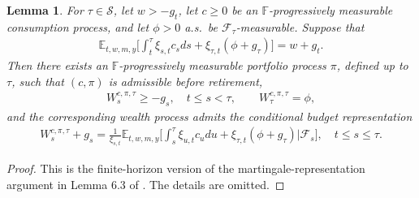 \documentclass[a4paper,11pt]{amsart}
\numberwithin{equation}{section}
\newtheorem{lemma}{Lemma}[section]
\newcommand{\blue}[1]{{\color{black}#1}}
\begin{document}
{\begin{lemma}\label{budegt}
{For $\tau\in\mathcal S$, let $w>-g_t$, let $c\geq0$ be an $\mathbb F$-progressively measurable consumption process, and let $\phi>0$ a.s.\ be $\mathcal F_\tau$-measurable. Suppose that}
\begin{align*}
\mathbb E_{t,w,m,y}\bigg[\int_t^\tau\xi_{s,t}c_sds+\xi_{\tau,t}(\phi+g_\tau)\bigg]=w+g_t.
\end{align*}
Then there exists an $\mathbb F$-progressively measurable portfolio process $\pi$, defined up to $\tau$, such that $(c,\pi)$ is admissible before retirement,
\begin{align*}
W_s^{c,\pi,\tau}\geq-g_s,\quad t\leq s<\tau,\qquad W_\tau^{c,\pi,\tau}=\phi,
\end{align*}
and the corresponding wealth process admits the conditional budget representation
\begin{align*}
W_s^{c,\pi,\tau}+g_s=\frac{1}{\xi_{s,t}}\mathbb E_{t,w,m,y}\bigg[\int_s^\tau\xi_{u,t}c_udu+\xi_{\tau,t}(\phi+g_\tau)\bigg|\mathcal F_s\bigg],\quad t\leq s\leq\tau.
\end{align*}
\end{lemma}
\begin{proof}
\color{black}
This is the finite-horizon version of the martingale-representation argument in Lemma 6.3 of \citet{karatzas2000utility}. The details are omitted. 
\end{proof}




}
\end{document}
